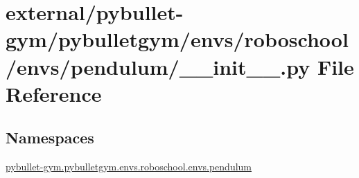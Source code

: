 \hypertarget{external_2pybullet-gym_2pybulletgym_2envs_2roboschool_2envs_2pendulum_2____init_____8py}{}\section{external/pybullet-\/gym/pybulletgym/envs/roboschool/envs/pendulum/\+\_\+\+\_\+init\+\_\+\+\_\+.py File Reference}
\label{external_2pybullet-gym_2pybulletgym_2envs_2roboschool_2envs_2pendulum_2____init_____8py}
\subsection*{Namespaces}
\begin{DoxyCompactItemize}
\item 
 \hyperlink{namespacepybullet-gym_1_1pybulletgym_1_1envs_1_1roboschool_1_1envs_1_1pendulum}{pybullet-\/gym.\+pybulletgym.\+envs.\+roboschool.\+envs.\+pendulum}
\end{DoxyCompactItemize}

